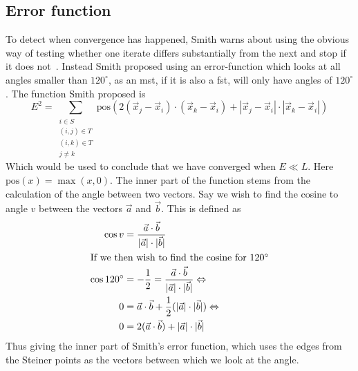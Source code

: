 \subsection{Error function}
\label{sec:error-function}


To detect when convergence has happened, Smith warns about using the obvious way
of testing whether one iterate differs substantially from the next and stop if
it does not~\cite[p.~151]{Smith1992}.  Instead Smith proposed using an
error-function which looks at all angles smaller than $120^{\circ}$, as an
\gls{mst}, if it is also a \gls{fst}, will only have angles of $120^{\circ}$.
The function Smith proposed is
%
\begin{equation}
  \label{eq:1} E^2 = \sum_{
    \begin{array}{c} i \in S \\ (i,j) \in T \\ (i,k) \in T \\ j \ne k
    \end{array}} \text{pos} (2 (\vec x_j - \vec x_i) \cdot (\vec x_k - \vec x_i)
+ | \vec x_j - \vec x_i | \cdot | \vec x_k - \vec x_i |)
\end{equation}
%
Which would be used to conclude that we have converged when $E \ll L$.  Here
$\text{pos}(x) = \max(x, 0)$.  The inner part of the function stems from the
calculation of the angle between two vectors.  Say we wish to find the cosine to
angle $v$ between the vectors $\vec a$ and $\vec b$.  This is defined as
%
\begin{align}
  \cos v & = \frac{\vec a \cdot \vec b}
    {|\vec a| \cdot |\vec b|} \label{eq:2}                 \\
  \intertext{If we then wish to find the cosine for $120^{\circ}$}
  \cos 120^{\circ}
         & = -\frac{1}{2} = \frac{\vec a \cdot \vec b}
    {|\vec a| \cdot |\vec b|} \Leftrightarrow \label{eq:3} \\
  0      & = \vec a \cdot \vec b + \frac{1}{2}
    (|\vec a| \cdot |\vec b|) \Leftrightarrow \label{eq:4} \\
  0      & = 2 (\vec a \cdot \vec b) + |\vec a| \cdot |\vec b| \label{eq:5}
\end{align}
%
Thus giving the inner part of Smith's error function, which uses the edges from
the Steiner points as the vectors between which we look at the angle.

